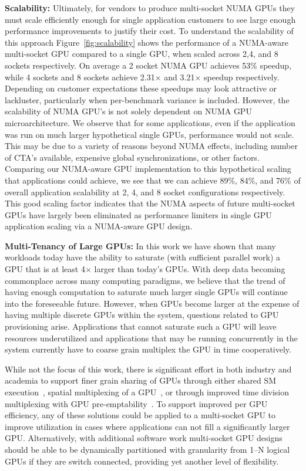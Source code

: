 \textbf{Scalability:} Ultimately, for vendors to produce multi-socket NUMA 
GPUs they must scale efficiently enough for single application customers to 
see large enough performance improvements to justify their cost.  To 
understand the scalability of this approach Figure~\ref{fig:scalability} 
shows the performance of a NUMA-aware multi-socket GPU compared to a single 
GPU, when scaled across 2,4, and 8 sockets respectively.  On average a 2 
socket NUMA GPU achieves 53\% speedup, while 4 sockets and 8 sockets achieve 
2.31$\times$ and 3.21$\times$ speedup respectively.  Depending on customer expectations these 
speedups may look attractive or lackluster, particularly when per-benchmark 
variance is included.  However, the scalability of NUMA GPU's is not solely 
dependent on NUMA GPU microarchitecture. We observe that for some 
applications, even if the application was run on much larger hypothetical 
single GPUs, performance would not scale.  This may be due to a variety of 
reasons beyond NUMA effects, including number of CTA's available, expensive 
global synchronizations, or other factors.  Comparing our NUMA-aware GPU 
implementation to this hypothetical scaling that applications could achieve, 
we see that we can achieve 89\%, 84\%, and 76\% of overall application 
scalability at 2, 4, and 8 socket configurations respectively.  This good 
scaling factor indicates that the NUMA aspects of future multi-socket GPUs 
have largely been eliminated as performance limiters in single GPU 
application scaling via a NUMA-aware GPU design.

\textbf{Multi-Tenancy of Large GPUs:} In this work we have shown that many 
workloads today have the ability to saturate (with sufficient parallel work) 
a GPU that is at least 4$\times$ larger than today's GPUs.  With deep data 
becoming commonplace across many computing paradigms, we believe that the 
trend of having enough computation to saturate much larger single GPUs will 
continue into the foreseeable future. However, when GPUs become larger at the 
expense of having multiple discrete GPUs within the system, questions related 
to GPU provisioning arise.  Applications that cannot saturate such a GPU will 
leave resources underutilized and applications that may be running 
concurrently in the system currently have to coarse grain multiplex the GPU 
in time cooperatively. 

While not the focus of this work, there is significant effort in both 
industry and academia to support finer grain sharing of GPUs through either 
shared SM execution~\cite{tanasic2014enabling}, spatial multiplexing of a 
GPU~\cite{park2015chimera}, or through improved time division multiplexing 
with GPU pre-emptability~\cite{lin2016enabling}.  To support improved per GPU 
efficiency, any of these solutions could be applied to a multi-socket GPU to 
improve utilization in cases where applications can not fill a significantly 
larger GPU.  Alternatively, with additional software work multi-socket GPU 
designs should be able to be dynamically partitioned with granularity from 
1--N logical GPUs if they are switch connected, providing yet another level 
of flexibility.

